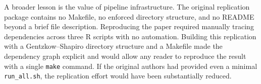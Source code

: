\documentclass[12pt]{article}
\begin{document}
A broader lesson is the value of pipeline infrastructure. The original
replication package contains no Makefile, no enforced directory structure,
and no README beyond a brief file description. Reproducing the paper required
manually tracing dependencies across three R scripts with no automation.
Building this replication with a Gentzkow--Shapiro directory structure and
a Makefile made the dependency graph explicit and would allow any reader to
reproduce the result with a single \texttt{make} command. If the original
authors had provided even a minimal \texttt{run\_all.sh}, the replication
effort would have been substantially reduced.



\end{document}
